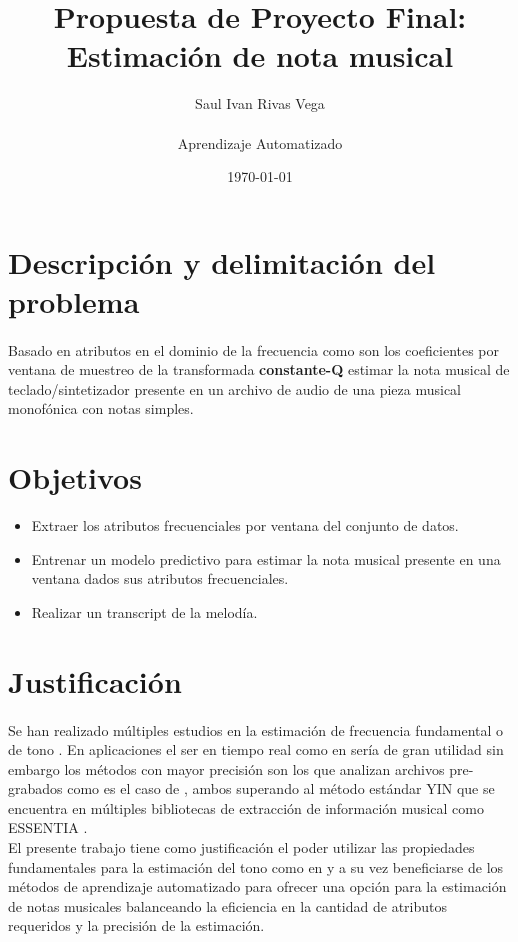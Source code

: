 \documentclass[12pt]{article}
\title{Propuesta de Proyecto Final:\\
	Estimación de nota musical}
\author{
	Saul Ivan Rivas Vega \\
	\\
	Aprendizaje Automatizado\\
}
\date{\today}
\begin{document}
	\maketitle
	\pagebreak
	\section{Descripción y delimitación del problema}
	  \paragraph{} Basado en atributos en el dominio de la frecuencia como son los coeficientes por ventana de muestreo de la transformada \textbf{constante-Q} estimar la nota musical de teclado/sintetizador presente en un archivo de audio de una pieza musical monofónica con notas simples.
	\section{Objetivos}
	\begin{itemize}
	\item Extraer los atributos frecuenciales por ventana del conjunto de datos.
	\item Entrenar un modelo predictivo para estimar la nota musical presente en una ventana dados sus atributos frecuenciales.
	\item Realizar un transcript de la melodía.
	\end{itemize}
	\section{Justificación}
	\paragraph{} Se han realizado múltiples estudios en la estimación de frecuencia fundamental o de tono \cite{das_real-time_2017,kim_crepe_2018,mauch_pyin_2014,de_cheveigne_yin_2002}. En aplicaciones el ser en tiempo real como en \cite{das_real-time_2017} sería de gran utilidad sin embargo los métodos con mayor precisión son los que analizan archivos pre-grabados como es el caso de \cite{kim_crepe_2018,mauch_pyin_2014}, ambos superando al método estándar YIN \cite{de_cheveigne_yin_2002} que se encuentra en múltiples bibliotecas de extracción de información musical como ESSENTIA \cite{bogdanov_essentia_2013}.\\
	El presente trabajo tiene como justificación el poder utilizar las propiedades fundamentales para la estimación del tono como en \cite{de_cheveigne_yin_2002,brown_calculation_1991,brown_efficient_1992} y a su vez beneficiarse de los métodos de aprendizaje automatizado para ofrecer una opción para la estimación de notas musicales balanceando la eficiencia en la cantidad de atributos requeridos y la precisión de la estimación.
\end{document}
